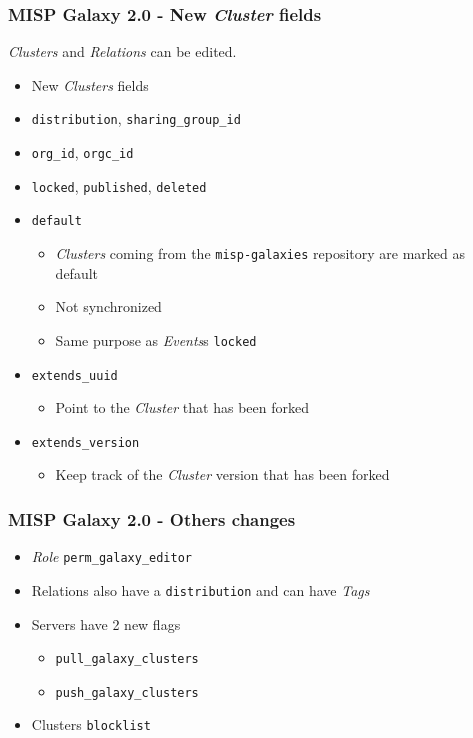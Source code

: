 \begin{frame}
    \frametitle{MISP Galaxy 2.0 - New \textit{Cluster} fields}
    \textit{Clusters} and \textit{Relations} can be edited.
    \begin{itemize}
        \item New \textit{Clusters} fields
        \item \texttt{distribution}, \texttt{sharing\_group\_id}
        \item \texttt{org\_id}, \texttt{orgc\_id}
        \item \texttt{locked}, \texttt{published}, \texttt{deleted}
        \item \texttt{default}
        \begin{itemize}
            \item \textit{Clusters} coming from the \texttt{misp-galaxies} repository are marked as default
            \item Not synchronized
        \end{itemize}
        \begin{itemize}
            \item Same purpose as \textit{Events}s \texttt{locked}
        \end{itemize}
        \item \texttt{extends\_uuid}
        \begin{itemize}
            \item Point to the \textit{Cluster} that has been forked
        \end{itemize}
        \item \texttt{extends\_version}
        \begin{itemize}
            \item Keep track of the \textit{Cluster} version that has been forked
        \end{itemize}
    \end{itemize}
\end{frame}

\begin{frame}
    \frametitle{MISP Galaxy 2.0 - Others changes}
    \begin{itemize}
        \item \textit{Role} \texttt{perm\_galaxy\_editor}
        \item Relations also have a \texttt{distribution} and can have \textit{Tags}
        \item Servers have 2 new flags
        \begin{itemize}
            \item \texttt{pull\_galaxy\_clusters}
            \item \texttt{push\_galaxy\_clusters}
        \end{itemize}
        \item Clusters \texttt{blocklist}
    \end{itemize}
\end{frame}

